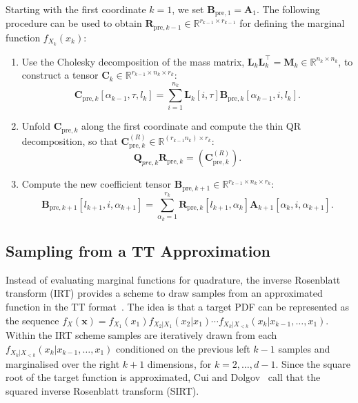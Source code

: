 \begin{prop}
	\label{prob:ForMarg}
	Starting with the first coordinate $k = 1$, we set $\bm{B}_{\text{pre},1} = \bm{A}_1$. The following procedure can be used to obtain $\bm{R}_{\text{pre},k-1} \in \mathbb{R}^{r_{k-1}  \times r_{k-1}}$ for defining the marginal function $f_{X_k}(x_k)$:
	\begin{enumerate}
		\item Use the Cholesky decomposition of the mass matrix, $\bm{L}_k \bm{L}_k^\top = \bm{M}_k \in \mathbb{R}^{n_k \times n_k}$, to construct a tensor $\bm{C}_k \in \mathbb{R}^{r_{k-1} \times n_k \times r_k}$:
		\begin{equation}
			\bm{C}_{\text{pre},k}[\alpha_{k-1}, \tau, l_k] = \sum_{i=1}^{n_k} \bm{L}_k[i, \tau] \bm{B}_{\text{pre},k}[\alpha_{k-1}, i, l_k] .\label{eq:constrCForw}
		\end{equation}
		\item Unfold $\bm{C}_{\text{pre},k}$ along the first coordinate and compute the thin QR decomposition, so that $\bm{C}_{\text{pre},k}^{(R)} \in \mathbb{R}^{(r_{k-1} n_k ) \times r_k}$:
		\begin{equation}
			\bm{Q}_{pre,k}\bm{R}_{\text{pre},k} = {(\bm{C}_{\text{pre},k}^{(R)})}.\label{eq:thinQRForw}
		\end{equation}
		\item Compute the new coefficient tensor $\bm{B}_{\text{pre}, k+1} \in \mathbb{R}^{r_{k-1} \times n_k \times r_k} $:
		\begin{equation}
			\bm{B}_{\text{pre}, k+1}[l_{k+1}, i, \alpha_{k+1}] = \sum_{\alpha_{k}=1}^{r_{k}} \bm{R}_{\text{pre},k}[l_{k+1}, \alpha_{k}] \bm{A}_{k+1}[\alpha_{k}, i, \alpha_{k+1}] .\label{eq:nextCoeffTForw}
		\end{equation}
	\end{enumerate}
\end{prop}

\clearpage
\subsection{Sampling from a TT Approximation}
\label{subsec:SamplTT}
Instead of evaluating marginal functions for quadrature, the inverse Rosenblatt transform (IRT) provides a scheme to draw samples from an approximated function in the TT format~\cite{dolgov2020approximation}.
The idea is that a target PDF can be represented as the sequence $ f_X(\bm{x})  =   f_{X_1}(x_1)  f_{X_2|X_1}(x_2|x_1) \cdots  f_{X_k|X_{<k}}(x_k|x_{k-1},\dots,x_1)$.
Within the IRT scheme samples are iteratively drawn from each $f_{X_k|X_{<k}}(x_k|x_{k-1},\dots,x_1)$ conditioned on the previous left $k-1$ samples and marginalised over the right $k + 1$ dimensions, for $k = 2 , \dots, d-1$.
Since the square root of the target function is approximated, Cui and Dolgov~\cite{cui2022deep} call that the squared inverse Rosenblatt transform (SIRT).

